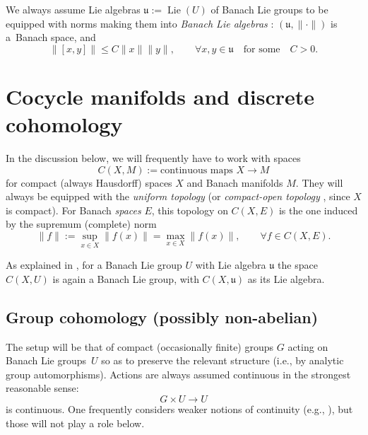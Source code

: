 \documentclass[pdftex]{sigma}
\numberwithin{equation}{section}
\newcommand\fu{{\mathfrak u}}
\begin{document}
We always assume Lie algebras $\fu:=\operatorname{Lie}(U)$ of Banach Lie groups to be equipped with norms making them into {\it Banach Lie algebras} \cite[discussion following Definition IV.1]{neeb-inf}: $(\fu,\|\cdot\|)$ is a~Banach space, and
\begin{equation*}
 \|[x,y]\|\le C\|x\| \|y\|,\qquad \forall x,y\in \fu \quad\text{for some}\quad C>0.
\end{equation*}

\section{Cocycle manifolds and discrete cohomology}\label{subse:cocyman}

In the discussion below, we will frequently have to work with spaces
\begin{equation*}
 C(X,M)
 :=
 \text{continuous maps }X\to M
\end{equation*}
for compact (always Hausdorff) spaces $X$ and Banach manifolds $M$. They will always be equipped with the {\it uniform topology} (or {\it compact-open topology} \cite[Definition preceding Theorem 46.8]{munk}, since $X$ is compact). For Banach {\it spaces} $E$, this topology on $C(X,E)$ is the one induced by the supremum (complete) norm
\begin{equation*}
 \|f\|:=\sup_{x\in X}\|f(x)\| = \max_{x\in X}\|f(x)\|,\qquad \forall f\in C(X,E).
\end{equation*}

As explained in \cite[Section~3.2]{ps-loop}, for a Banach Lie group $U$ with Lie algebra $\fu$ the space $C(X,U)$ is again a Banach Lie group, with $C(X,\fu)$ as its Lie algebra.

\subsection{Group cohomology (possibly non-abelian)}\label{subse:coh}

The setup will be that of compact (occasionally finite) groups $G$ acting on Banach Lie groups~$U$ so as to preserve the relevant structure (i.e., by analytic group automorphisms). Actions are always assumed continuous in the strongest reasonable sense:
\begin{equation*}
 G\times U\to U
\end{equation*}
is continuous. One frequently considers weaker notions of continuity (e.g., \cite[Section~X.1]{tak2}), but those will not play a role below.
\end{document}
